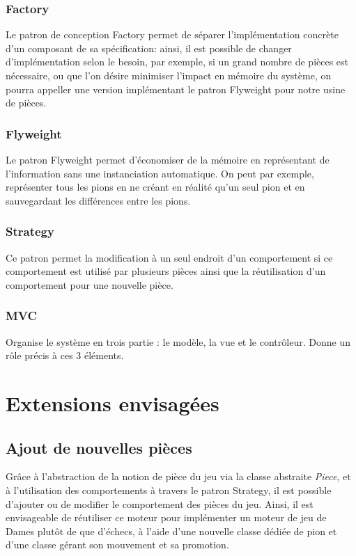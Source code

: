 \documentclass[11pt]{article}
\begin{document}
\subsubsection{Factory}
\label{sec-3-3-2}
Le patron de conception Factory permet de séparer l'implémentation concrète d'un composant de sa spécification: ainsi, il est possible de changer d'implémentation selon le besoin, par exemple, si un grand nombre de pièces est nécessaire, ou que l'on désire minimiser l'impact en mémoire du système, on pourra appeller une version implémentant le patron Flyweight pour notre usine de pièces.
\subsubsection{Flyweight}
\label{sec-3-3-3}
Le patron Flyweight permet d'économiser de la mémoire en représentant de l'information sans une instanciation automatique. On peut par exemple, représenter tous les pions en ne créant en réalité qu'un seul pion et en sauvegardant les différences entre les pions.
\subsubsection{Strategy}
\label{sec-3-3-4}
Ce patron permet la modification à un seul endroit d'un comportement si ce comportement est utilisé par plusieurs pièces ainsi que la réutilisation d'un comportement pour une nouvelle pièce.
\subsubsection{MVC}
\label{sec-3-3-5}

    Organise le système en trois partie : le modèle, la vue et le contrôleur.
    Donne un rôle précis à ces 3 éléments.
\section{Extensions envisagées}
\label{sec-4}
\subsection{Ajout de nouvelles pièces}
\label{sec-4-1}
Grâce à l'abstraction de la notion de pièce du jeu via la classe abstraite \emph{Piece}, et à l'utilisation des comportements à travers le patron Strategy, il est possible d'ajouter ou de modifier le comportement des pièces du jeu. Ainsi, il est envisageable de réutiliser ce moteur pour implémenter un moteur de jeu de Dames plutôt de que d'échecs, à l'aide d'une nouvelle classe dédiée de pion et d'une classe gérant son mouvement et sa promotion.
\end{document}

